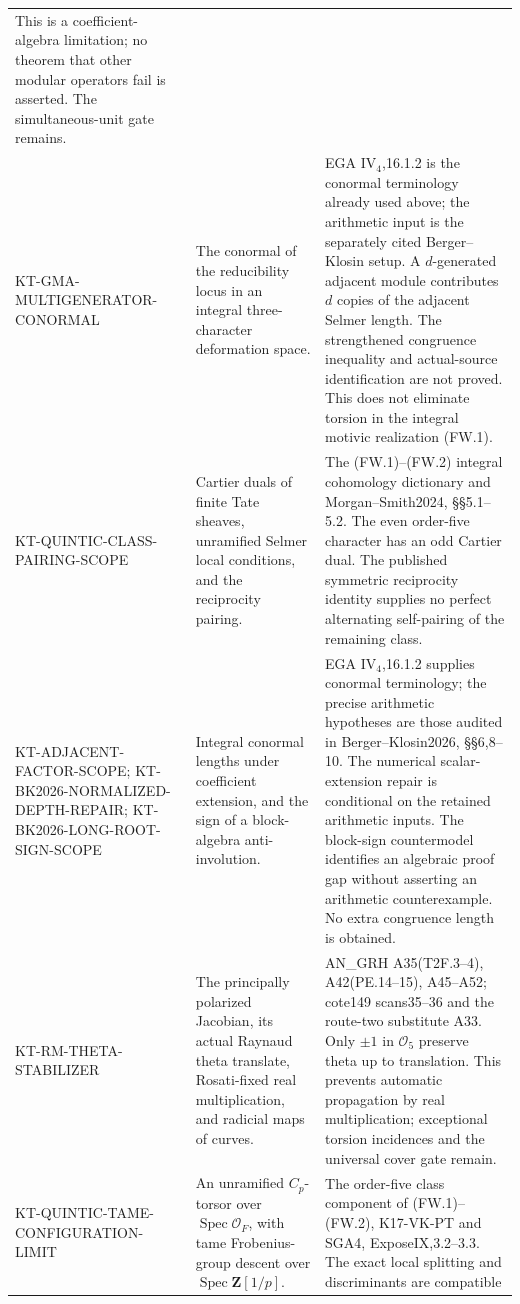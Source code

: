 \documentclass[11pt,a4paper]{article}
\theoremstyle{definition}
\begin{document}
\begin{longtable}{>{\raggedright\arraybackslash}p{}
>{\raggedright\arraybackslash}p{}
>{\raggedright\arraybackslash}p{}}
This is a coefficient-algebra limitation; no theorem that other
modular operators fail is asserted. The simultaneous-unit gate remains.\\
KT-GMA-MULTIGENERATOR-CONORMAL &
The conormal of the reducibility locus in an integral
three-character deformation space. &
EGA IV$_4$,16.1.2 is the conormal terminology already used above;
the arithmetic input is the separately cited Berger--Klosin setup.
A $d$-generated adjacent module contributes $d$ copies of the
adjacent Selmer length. The strengthened congruence inequality
and actual-source identification are not proved. This does not
eliminate torsion in the integral motivic realization (FW.1).\\
KT-QUINTIC-CLASS-PAIRING-SCOPE &
Cartier duals of finite Tate sheaves, unramified Selmer local
conditions, and the reciprocity pairing. &
The (FW.1)--(FW.2) integral cohomology dictionary and
Morgan--Smith2024, \S\S5.1--5.2.
The even order-five character has an odd Cartier dual.
The published symmetric reciprocity identity supplies no
perfect alternating self-pairing of the remaining class.\\
KT-ADJACENT-FACTOR-SCOPE;
KT-BK2026-NORMALIZED-DEPTH-REPAIR;
KT-BK2026-LONG-ROOT-SIGN-SCOPE &
Integral conormal lengths under coefficient extension,
and the sign of a block-algebra anti-involution. &
EGA IV$_4$,16.1.2 supplies conormal terminology;
the precise arithmetic hypotheses are those audited in
Berger--Klosin2026, \S\S6,8--10.
The numerical scalar-extension repair is conditional on
the retained arithmetic inputs. The block-sign countermodel
identifies an algebraic proof gap without asserting an
arithmetic counterexample. No extra congruence length is obtained.\\
KT-RM-THETA-STABILIZER &
The principally polarized Jacobian, its actual Raynaud theta
translate, Rosati-fixed real multiplication, and radicial
maps of curves. &
AN\_GRH A35(T2F.3--4), A42(PE.14--15), A45--A52;
cote149 scans35--36 and the route-two substitute A33.
Only $\pm1$ in $\mathcal O_5$ preserve theta up to translation.
This prevents automatic propagation by real multiplication;
exceptional torsion incidences and the universal cover gate remain.\\
KT-QUINTIC-TAME-CONFIGURATION-LIMIT &
An unramified $C_p$-torsor over $\operatorname{Spec}\mathcal O_F$,
with tame Frobenius-group descent over $\operatorname{Spec}\mathbf Z[1/p]$. &
The order-five class component of (FW.1)--(FW.2),
K17-VK-PT and SGA4, ExposeIX,3.2--3.3.
The exact local splitting and discriminants are compatible

\end{longtable}
\end{document}
